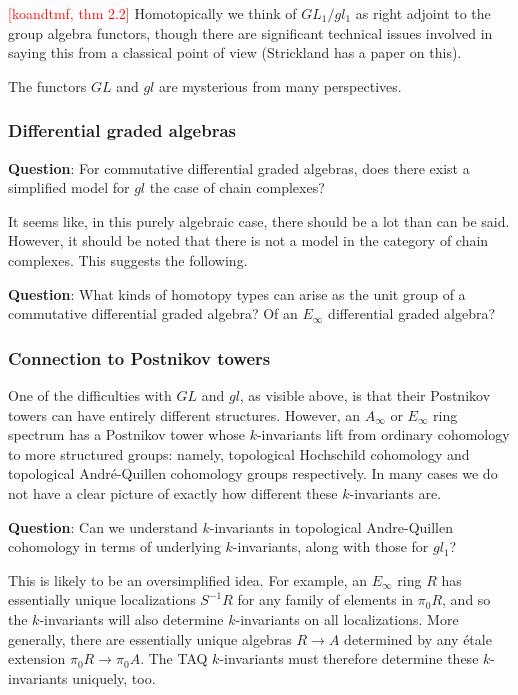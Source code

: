 \documentclass[12pt,titlepage]{article}
\newcommand{\rd}[1]{{\textcolor{red}{#1}}}
\theoremstyle{plain}
\theoremstyle{definition}
\theoremstyle{remark}
\begin{document}
\rd{[koandtmf, thm 2.2]} Homotopically we think of $GL_1/gl_1$ as right adjoint to the group algebra functors, though there are significant technical issues involved in saying this from a classical point of view (Strickland has a paper on this).

The functors $GL$ and $gl$ are mysterious from many perspectives.

\hypertarget{differential_graded_algebras_2}{}\subsubsection{{Differential graded algebras}}\label{differential_graded_algebras_2}

\textbf{Question}: For commutative differential graded algebras, does there exist a simplified model for $gl$ the case of chain complexes?

It seems like, in this purely algebraic case, there should be a lot than can be said. However, it should be noted that there is not a model in the category of chain complexes. This suggests the following.

\textbf{Question}: What kinds of homotopy types can arise as the unit group of a commutative differential graded algebra? Of an $E_\infty$ differential graded algebra?

\hypertarget{connection_to_postnikov_towers_3}{}\subsubsection{{Connection to Postnikov towers}}\label{connection_to_postnikov_towers_3}

One of the difficulties with $GL$ and $gl$, as visible above, is that their Postnikov towers can have entirely different structures. However, an $A_\infty$ or $E_\infty$ ring spectrum has a Postnikov tower whose $k$-invariants lift from ordinary cohomology to more structured groups: namely, topological Hochschild cohomology and topological André-Quillen cohomology groups respectively. In many cases we do not have a clear picture of exactly how different these $k$-invariants are.

\textbf{Question}: Can we understand $k$-invariants in topological Andre-Quillen cohomology in terms of underlying $k$-invariants, along with those for $gl_1$?

This is likely to be an oversimplified idea. For example, an $E_\infty$ ring $R$ has essentially unique localizations $S^{-1} R$ for any family of elements in $\pi_0 R$, and so the $k$-invariants will also determine $k$-invariants on all localizations. More generally, there are essentially unique algebras $R \to A$ determined by any étale extension $\pi_0 R \to \pi_0 A$. The TAQ $k$-invariants must therefore determine these $k$-invariants uniquely, too.
\end{document}
